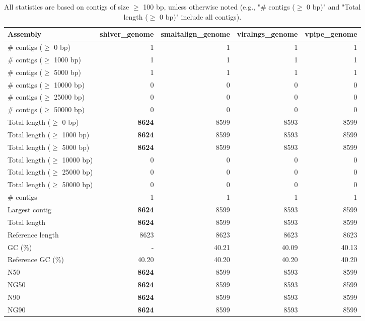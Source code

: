 \documentclass[12pt,a4paper]{article}
\begin{document}
\begin{table}[ht]
\begin{center}
\caption{All statistics are based on contigs of size $\geq$ 100 bp, unless otherwise noted (e.g., "\# contigs ($\geq$ 0 bp)" and "Total length ($\geq$ 0 bp)" include all contigs).}
\begin{tabular}{|l*{4}{|r}|}
\hline
Assembly & shiver\_genome & smaltalign\_genome & viralngs\_genome & vpipe\_genome \\ \hline
\# contigs ($\geq$ 0 bp) & 1 & 1 & 1 & 1 \\ \hline
\# contigs ($\geq$ 1000 bp) & 1 & 1 & 1 & 1 \\ \hline
\# contigs ($\geq$ 5000 bp) & 1 & 1 & 1 & 1 \\ \hline
\# contigs ($\geq$ 10000 bp) & 0 & 0 & 0 & 0 \\ \hline
\# contigs ($\geq$ 25000 bp) & 0 & 0 & 0 & 0 \\ \hline
\# contigs ($\geq$ 50000 bp) & 0 & 0 & 0 & 0 \\ \hline
Total length ($\geq$ 0 bp) & {\bf 8624} & 8599 & 8593 & 8599 \\ \hline
Total length ($\geq$ 1000 bp) & {\bf 8624} & 8599 & 8593 & 8599 \\ \hline
Total length ($\geq$ 5000 bp) & {\bf 8624} & 8599 & 8593 & 8599 \\ \hline
Total length ($\geq$ 10000 bp) & 0 & 0 & 0 & 0 \\ \hline
Total length ($\geq$ 25000 bp) & 0 & 0 & 0 & 0 \\ \hline
Total length ($\geq$ 50000 bp) & 0 & 0 & 0 & 0 \\ \hline
\# contigs & 1 & 1 & 1 & 1 \\ \hline
Largest contig & {\bf 8624} & 8599 & 8593 & 8599 \\ \hline
Total length & {\bf 8624} & 8599 & 8593 & 8599 \\ \hline
Reference length & 8623 & 8623 & 8623 & 8623 \\ \hline
GC (\%) & - & 40.21 & 40.09 & 40.13 \\ \hline
Reference GC (\%) & 40.20 & 40.20 & 40.20 & 40.20 \\ \hline
N50 & {\bf 8624} & 8599 & 8593 & 8599 \\ \hline
NG50 & {\bf 8624} & 8599 & 8593 & 8599 \\ \hline
N90 & {\bf 8624} & 8599 & 8593 & 8599 \\ \hline
NG90 & {\bf 8624} & 8599 & 8593 & 8599 \\ \hline

\end{tabular}
\end{center}
\end{table}
\end{document}
